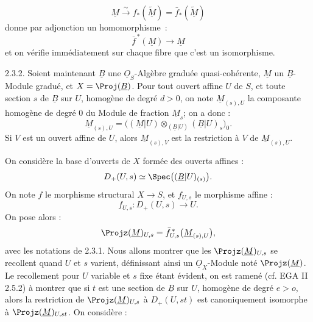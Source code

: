
\[
  \underline{M}\xrightarrow{\sim} f_*(\widetilde{\underline{M}})=\bar f_*(\widetilde{\underline{M}})
\]
donne par adjonction un homomorphisme~:
\[
  \bar f^{\,*}(\underline{M})\longrightarrow \underline{M}
\]
et on vérifie immédiatement sur chaque fibre que c'est un isomorphisme.

2.3.2. Soient maintenant \(\underline{B}\) une \(\underline{O}_S\)-Algèbre graduée quasi-cohérente, \(\underline{M}\) un \(\underline{B}\)-Module gradué, et \(X=\Proj(\underline{B})\). Pour tout ouvert affine \(U\) de \(S\), et toute section \(s\) de \(\underline{B}\) sur \(U\), homogène de degré \(d>0\), on note \(\underline{M}_{(s),U}\) la composante homogène de degré \(0\) du Module de fraction \(\underline{M}_s\); on a donc :
\[
  \underline{M}_{(s),U}=
  \bigl((\underline{M}|U)\otimes_{(\underline{B}|U)}(\underline{B}|U)_s\bigr)_0 .
\]
Si \(V\) est un ouvert affine de \(U\), alors \(\underline{M}_{(s),V}\) est la restriction à \(V\) de \(\underline{M}_{(s),U}\).

On considère la base d'ouverts de \(X\) formée des ouverts affines :
\[
  D_+(U,s)\simeq \Spec\bigl((\underline{B}|U)_{(s)}\bigr) .
\]
On note \(f\) le morphisme structural \(X\to S\), et \(f_{U,s}\) le morphisme affine :
\[
  f_{U,s}:D_+(U,s)\longrightarrow U .
\]
On pose alors :
\[
  \Projz(\underline{M})_{U,s}
  =
  \bar f_{U,s}^{\,*}\bigl(\underline{M}_{(s),U}\bigr),
\]
avec les notations de 2.3.1. Nous allons montrer que les \(\Projz(\underline{M})_{U,s}\) se recollent quand \(U\) et \(s\) varient, définissant ainsi un \(\underline{O}_X\)-Module noté \(\Projz(\underline{M})\). Le recollement pour \(U\) variable et \(s\) fixe étant évident, on est ramené (cf. EGA II 2.5.2) à montrer que si \(t\) est une section de \(\underline{B}\) sur \(U\), homogène de degré \(e>o\), alors la restriction de \(\Projz(\underline{M})_{U,s}\) à \(D_+(U,st)\) est canoniquement isomorphe à \(\Projz(\underline{M})_{U,st}\). On considère :
